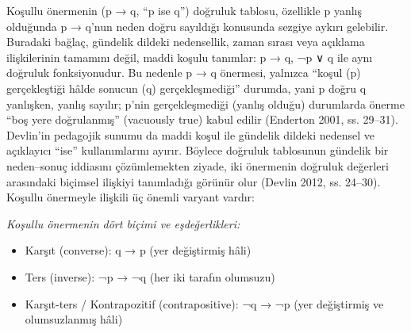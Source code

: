 Koşullu önermenin (p → q, “p ise q”) doğruluk tablosu, özellikle p yanlış olduğunda p → q’nun neden doğru sayıldığı konusunda sezgiye aykırı gelebilir. Buradaki bağlaç, gündelik dildeki nedensellik, zaman sırası veya açıklama ilişkilerinin tamamını değil, maddi koşulu tanımlar: p → q, ¬p ∨ q ile aynı doğruluk fonksiyonudur. Bu nedenle p → q önermesi, yalnızca “koşul (p) gerçekleştiği hâlde sonucun (q) gerçekleşmediği” durumda, yani p doğru q yanlışken, yanlış sayılır; p’nin gerçekleşmediği (yanlış olduğu) durumlarda önerme “boş yere doğrulanmış” (vacuously true) kabul edilir (Enderton 2001, ss. 29–31). Devlin’in pedagojik sunumu da maddi koşul ile gündelik dildeki nedensel ve açıklayıcı “ise” kullanımlarını ayırır. Böylece doğruluk tablosunun gündelik bir neden–sonuç iddiasını çözümlemekten ziyade, iki önermenin doğruluk değerleri arasındaki biçimsel ilişkiyi tanımladığı görünür olur (Devlin 2012, ss. 24–30). Koşullu önermeyle ilişkili üç önemli varyant vardır:

\par\smallskip\begin{center}{\small\itshape\sffamily\color{gray}Koşullu önermenin dört biçimi ve eşdeğerlikleri:}\par{}\end{center}\par\smallskip

\begin{itemize}\setlength{\itemsep}{2pt}\setlength{\parskip}{0pt}
\item Karşıt (converse): q → p (yer değiştirmiş hâli)
\item Ters (inverse): ¬p → ¬q (her iki tarafın olumsuzu)
\item Karşıt-ters / Kontrapozitif (contrapositive): ¬q → ¬p (yer değiştirmiş ve olumsuzlanmış hâli)
\end{itemize}

